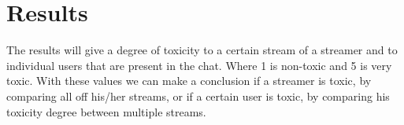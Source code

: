 \documentclass[final]{report}
\begin{document}
\chapter{Results}
\label{ch:results}

The results will give a degree of toxicity to a certain stream of a streamer and to individual users that are present in the chat.
Where 1 is non-toxic and 5 is very toxic.
With these values we can make a conclusion if a streamer is toxic, by comparing all off his/her streams, or if a certain user is toxic, by comparing his toxicity degree between multiple streams.
\end{document}
